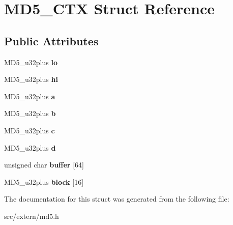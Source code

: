 \hypertarget{structMD5__CTX}{\section{M\+D5\+\_\+\+C\+T\+X Struct Reference}
\label{structMD5__CTX}
}
\subsection*{Public Attributes}
\begin{DoxyCompactItemize}
\item 
\hypertarget{structMD5__CTX_a90437ec62a8dda787f1667061d9755fe}{M\+D5\+\_\+u32plus {\bfseries lo}}\label{structMD5__CTX_a90437ec62a8dda787f1667061d9755fe}

\item 
\hypertarget{structMD5__CTX_a3234f683810977ac629c2a8a05a1cc87}{M\+D5\+\_\+u32plus {\bfseries hi}}\label{structMD5__CTX_a3234f683810977ac629c2a8a05a1cc87}

\item 
\hypertarget{structMD5__CTX_abfbd731eb0b9d13a75ee4e49715e30b5}{M\+D5\+\_\+u32plus {\bfseries a}}\label{structMD5__CTX_abfbd731eb0b9d13a75ee4e49715e30b5}

\item 
\hypertarget{structMD5__CTX_a63ef5819a909e0b4065796dfdac25962}{M\+D5\+\_\+u32plus {\bfseries b}}\label{structMD5__CTX_a63ef5819a909e0b4065796dfdac25962}

\item 
\hypertarget{structMD5__CTX_a6226440d9b52200d32153df206fe3761}{M\+D5\+\_\+u32plus {\bfseries c}}\label{structMD5__CTX_a6226440d9b52200d32153df206fe3761}

\item 
\hypertarget{structMD5__CTX_a3b2316dbfcad4bdb1306dc441761f396}{M\+D5\+\_\+u32plus {\bfseries d}}\label{structMD5__CTX_a3b2316dbfcad4bdb1306dc441761f396}

\item 
\hypertarget{structMD5__CTX_a2da73ecf544745f58211e998719f367f}{unsigned char {\bfseries buffer} \mbox{[}64\mbox{]}}\label{structMD5__CTX_a2da73ecf544745f58211e998719f367f}

\item 
\hypertarget{structMD5__CTX_a2db62677a153981a205d225b051f0609}{M\+D5\+\_\+u32plus {\bfseries block} \mbox{[}16\mbox{]}}\label{structMD5__CTX_a2db62677a153981a205d225b051f0609}

\end{DoxyCompactItemize}


The documentation for this struct was generated from the following file\+:\begin{DoxyCompactItemize}
\item 
src/extern/md5.\+h\end{DoxyCompactItemize}
